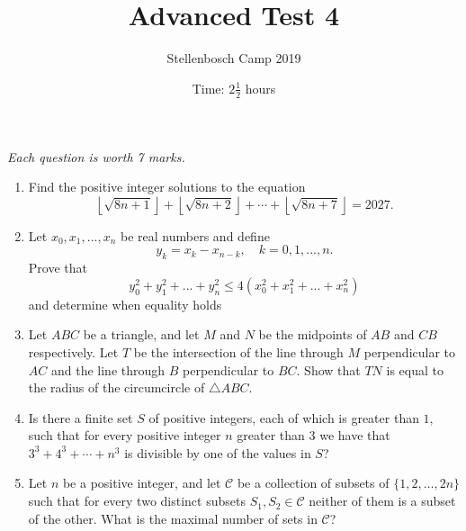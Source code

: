 \documentclass{article}
\title{Advanced Test 4}
\author{Stellenbosch Camp 2019}
\date{Time: $2\frac{1}{2}$ hours}
\begin{document}
\maketitle
\thispagestyle{empty}

\hfill\textit{Each question is worth 7 marks.}

\vfill
\vfill


\begin{enumerate}[1.]

\item %
\newcommand{\floorsqrt}[1]{\left\lfloor\sqrt{#1}\right\rfloor}
Find the positive integer solutions to the equation
\[ \floorsqrt{8n+1} +\floorsqrt{8n+2} +\dotsb +\floorsqrt{8n+7} = 2027. \]


\vfill

\item %
Let $x_0, x_1,..., x_n$ be real numbers and define
\[y_k=x_k-x_{n-k}, \quad k=0,1,...,n.\]
Prove that 
\[y_0^2+ y_1^2+...+ y_n^2 \leq 4(x_0^2 + x_1^2 + ... + x_n^2) \]
and determine when equality holds


\vfill

\item %
Let $ABC$ be a triangle, and let $M$ and $N$ be the midpoints of $AB$ and $CB$ respectively.
Let $T$ be the intersection of the line through $M$ perpendicular to $AC$ and the line through $B$ perpendicular to $BC$.
Show that $TN$ is equal to the radius of the circumcircle of $\triangle ABC$.


\vfill

\item %
Is there a finite set $S$ of positive integers, each of which is greater than $1$, such that for every positive integer $n$ greater than $3$ we have that $3^3 +4^3 +\dotsb +n^3$ is divisible by one of the values in $S$?


\vfill

\item %
\newcommand{\CC}{\mathcal{C}}
Let $n$ be a positive integer, and let $\CC$ be a collection of subsets of $\{1, 2, \dotsc, 2n\}$ such that for every two distinct subsets $S_1, S_2 \in \CC$ neither of them is a subset of the other.
What is the maximal number of sets in $\CC$?


\end{enumerate}
\end{document}
